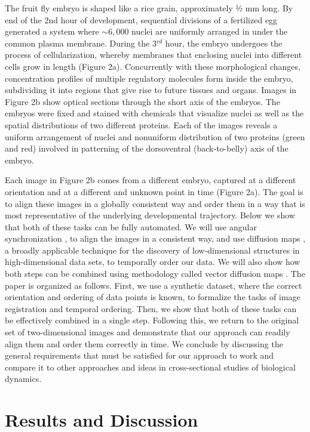 \documentclass{pnastwo}
\begin{document}
\begin{article}
The fruit fly embryo is shaped like a rice grain, approximately ½ mm long. By end of the 2nd hour of development, sequential divisions of a fertilized egg generated a system where $\sim 6,000$ nuclei are uniformly arranged in under the common plasma membrane. During the 3$^{rd}$ hour, the embryo undergoes the process of cellularization, whereby membranes that enclosing nuclei into different cells grow in length (Figure 2a). Concurrently with these morphological changes, concentration profiles of multiple regulatory molecules form inside the embryo, subdividing it into regions that give rise to future tissues and organs. Images in Figure 2b show optical sections through the short axis of the embryos. The embryos were fixed and stained with chemicals that visualize nuclei as well as the spatial distributions of two different proteins. Each of the images reveals a uniform arrangement of nuclei and nonuniform distribution of two proteins (green and red) involved in patterning of the dorsoventral (back-to-belly) axis of the embryo. 

Each image in Figure 2b comes from a different embryo, captured at a different orientation and at a different and unknown point in time (Figure 2a). The goal is to align these images in a globally consistent way and order them in a way that is most representative of the underlying developmental trajectory. Below we show that both of these tasks can be fully automated.
%
We will use angular synchronization \cite{singer2011angular}, to align the images in a consistent way, and use diffusion maps \cite{coifman2005geometric}, a broadly applicable technique for the discovery of low-dimensional structures in high-dimensional data sets, to temporally order our data.
%
We will also show how both steps can be combined using methodology called vector diffusion maps \cite{singer2012vector}.
%
The paper is organized as follows. First, we use a synthetic dataset, where the correct orientation and ordering of data points is known, to formalize the tasks of image registration and temporal ordering. Then, we show that both of these tasks can be effectively combined in a single step. Following this, we return to the original set of two-dimensional images and demonstrate that our approach can readily align them and order them correctly in time. We conclude by discussing the general requirements that must be satisfied for our approach to work and compare it to other approaches and ideas in cross-sectional studies of biological dynamics. 

\section{Results and Discussion}


\end{article}
\end{document}
